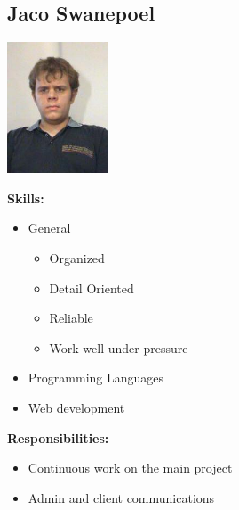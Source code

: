 \documentclass[a4paper,12pt,final]{article}
\begin{document}
\newpage
\subsection{Jaco Swanepoel}
\begin{center}
\includegraphics[width=3cm]{jaco.jpg}
\end{center}
\textbf{Skills:}
\begin{itemize}
\item General
\begin{itemize}
\item Organized
	\item Detail Oriented
	\item Reliable
	\item Work well under pressure
\end{itemize}
\item Programming Languages
\begin{itemize}
\end{itemize}
\item Web development
\begin{itemize}
\end{itemize}
\end{itemize}
\textbf{Responsibilities:}
\begin{itemize}
\item Continuous work on the main project
\item Admin and client communications
\end{itemize}
\end{document}
